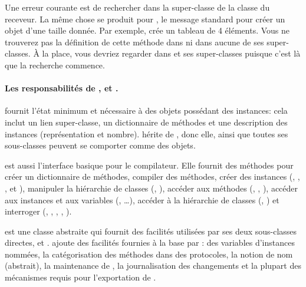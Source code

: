 \documentclass[a4paper,10pt,twoside]{book}
\begin{document}
Une erreur courante est de rechercher  dans la super-classe de la classe du receveur.
La même chose se produit pour , le message standard pour créer un objet d'une taille donnée.
Par exemple,  crée un tableau de 4 éléments.
Vous ne trouverez pas la définition de cette méthode dans  ni 
dans
aucune de ses super-classes.
À la place, vous devriez regarder dans  et ses super-classes puisque c'est là que la recherche commence.


\paragraph{Les responsabilités de ,  et .}
 fournit l'état minimum et nécessaire à des objets possédant des instances: cela inclut un lien super-classe, un dictionnaire de méthodes et une description des instances (\ie représentation et nombre).
 hérite de , donc elle, ainsi que toutes ses sous-classes peuvent se comporter comme des objets. 

 est aussi l'interface basique pour le compilateur.
Elle fournit des méthodes pour créer un dictionnaire de méthodes, compiler des méthodes, créer des instances (\ie {}, , , et ),
manipuler la hiérarchie de classes (\ie {}, ), 
accéder aux méthodes (\ie {}, , ),
accéder aux instances et aux variables (\ie {}, \ldots),
accéder à la hiérarchie de classes (\ie {}, )
et interroger  (\ie {}, , , , ).

 est une classe abstraite qui fournit des facilités utilisées par ses deux sous-classes directes,   et .
 ajoute des facilités fournies à la base par :
des variables d'instances nommées,
la catégorisation des méthodes dans des protocoles,
la notion de nom (abstrait),
la maintenance de \changesets, la journalisation des changements
et la plupart des mécanismes requis pour l'exportation de \changesets.
\end{document}
